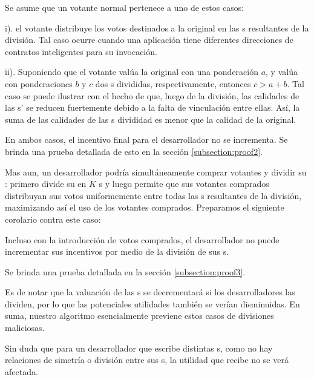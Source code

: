 Se asume que un votante normal pertenece a uno de estos casos:
\begin{inparaenum}
\item[i).] el votante distribuye los votos destinados a la \dapp original en las {\dapp}s resultantes de la división. Tal caso ocurre cuando una aplicación tiene diferentes direcciones de contratos inteligentes para su invocación.
\item[ii).] Suponiendo que el votante valúa la \dapp original con una ponderación $a$, y valúa con ponderaciones $b$ y $c$ dos {\dapp}s divididas, respectivamente, entonces $c>a+b$. Tal caso se puede ilustrar con el hecho de que, luego de la división, las calidades de las {\dapp}s' se reducen fuertemente debido a la falta de vinculación entre ellas. Así, la suma de las calidades de las {\dapp}s divididad es menor que la calidad de la \dapp original.
 \end{inparaenum}

  En ambos casos, el incentivo final para el desarrollador no se incrementa. Se brinda una prueba detallada de esto en la sección \ref{subsection:proof2}.

Mas aun, un desarrollador podría simultáneamente comprar votantes y dividir su \dapp: primero divide su \dapp en $K$ {\dapp}s y luego permite que sus votantes comprados distribuyan sus votos uniformemente entre todas las {\dapp}s resultantes de la división, maximizando así el uso de los votantes comprados. Preparamos el siguiente corolario contra este caso:

\begin{corollary}
	\label{c1}
	Incluso con la introducción de votos comprados, el desarrollador no puede incrementar sus incentivos por medio de la división de sus {\dapp}s.
\end{corollary}

Se brinda una prueba detallada en la sección \ref{subsection:proof3}.

Es de notar que la valuación de las {\dapp}s se decrementará si los desarrolladores las dividen, por lo que las potenciales utilidades también se verían disminuidas. En suma, nuestro algoritmo esencialmente previene estos casos de divisiones maliciosas.

Sin duda que para un desarrollador que escribe distintas {\dapp}s,
como no hay relaciones de simetría o división entre sus {\dapp}s, la utilidad que recibe no se verá afectada.

